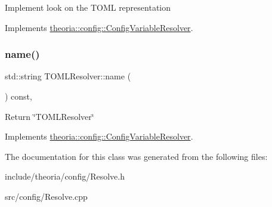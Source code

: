 Implement look on the T\+O\+ML representation 

Implements \hyperlink{classtheoria_1_1config_1_1ConfigVariableResolver}{theoria\+::config\+::\+Config\+Variable\+Resolver}.

\mbox{\label{classtheoria_1_1config_1_1TOMLResolver_a6b50ff1e396f74183318915e602837fc}} 
\subsubsection{\texorpdfstring{name()}{name()}}
{\footnotesize\ttfamily std\+::string T\+O\+M\+L\+Resolver\+::name (\begin{DoxyParamCaption}{ }\end{DoxyParamCaption}) const\hspace{0.3cm}{\ttfamily [override]}, {\ttfamily [virtual]}}

Return \char`\"{}\+T\+O\+M\+L\+Resolver\char`\"{} 

Implements \hyperlink{classtheoria_1_1config_1_1ConfigVariableResolver_a026bda729faf988eaef334a45ec92303}{theoria\+::config\+::\+Config\+Variable\+Resolver}.



The documentation for this class was generated from the following files\+:\begin{DoxyCompactItemize}
\item 
include/theoria/config/Resolve.\+h\item 
src/config/Resolve.\+cpp\end{DoxyCompactItemize}
